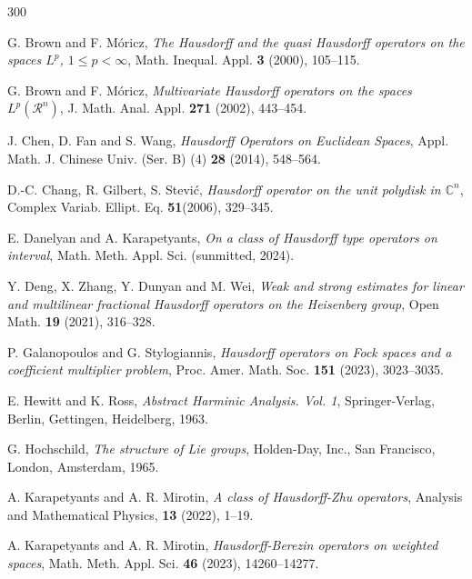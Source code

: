 \documentclass[12pt,reqno]{amsart}
\begin{document}
\begin{thebibliography}{300}

 G. Brown and F. M\'oricz, {\it The Hausdorff and the quasi Hausdorff operators on the spaces $L^p$, $1\le p<\infty$}, Math. Inequal. Appl. {\bf 3} (2000), 105--115.

 G. Brown and F. M\'oricz, {\it Multivariate Hausdorff operators on the spaces $L^p({\mathcal R}^n)$}, J. Math. Anal. Appl. {\bf 271} (2002), 443--454.







 J. Chen, D. Fan and S. Wang, {\it Hausdorff Operators on Euclidean Spaces}, Appl. Math. J. Chinese Univ. (Ser. B) (4) {\bf 28} (2014), 548--564.


  D.-C. Chang, R. Gilbert, S. Stevi\'c, {\it Hausdorff operator on the unit polydisk in $\mathbb C^n$}, Complex Variab. Ellipt. Eq. {\bf 51}(2006), 329--345.


 E. Danelyan and A. Karapetyants, {\it On a class of Hausdorff type operators on interval}, Math. Meth. Appl. Sci. (sunmitted, 2024).


 Y. Deng, X. Zhang, Y. Dunyan and M. Wei, {\it Weak and strong estimates for linear and multilinear fractional
Hausdorff operators on the Heisenberg group}, Open Math. {\bf 19} (2021), 316--328.





 P. Galanopoulos and G. Stylogiannis, {\it Hausdorff operators on Fock spaces and a coefficient multiplier problem}, Proc. Amer. Math. Soc. {\bf 151} (2023), 3023--3035.

 E. Hewitt and K. Ross, {\it Abstract Harminic Analysis. Vol. 1}, Springer-Verlag, Berlin, Gettingen, Heidelberg, 1963.

 G. Hochschild, {\it The structure of Lie groups}, Holden-Day, Inc., San Francisco, London, Amsterdam, 1965.




 A.  Karapetyants and  A. R. Mirotin,  {\it A class of Hausdorff-Zhu operators}, Analysis and Mathematical Physics, {\bf 13} (2022),  1--19.

 A.  Karapetyants and  A. R. Mirotin, {\it  Hausdorff-Berezin operators on weighted spaces},  Math. Meth. Appl. Sci. {\bf 46} (2023), 14260--14277. %


\end{thebibliography}
\end{document}
